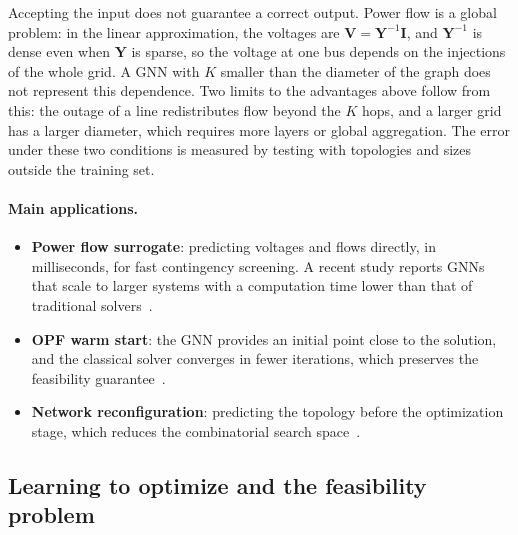 \documentclass[10pt,a4paper,oneside]{article}
\begin{document}
Accepting the input does not guarantee a correct output. Power flow is a
global problem: in the linear approximation, the voltages are
$\mathbf{V} = \mathbf{Y}^{-1}\mathbf{I}$, and $\mathbf{Y}^{-1}$ is dense even
when $\mathbf{Y}$ is sparse, so the voltage at one bus depends on the
injections of the whole grid. A GNN with $K$ smaller than the diameter of
the graph does not represent this dependence. Two limits to the advantages
above follow from this: the outage of a line redistributes flow beyond the
$K$ hops, and a larger grid has a larger diameter, which requires more
layers or global aggregation. The error under these two conditions is
measured by testing with topologies and sizes outside the training set.

\paragraph{Main applications.}
\begin{itemize}
  \item \textbf{Power flow surrogate}: predicting voltages and flows
    directly, in milliseconds, for fast contingency screening. A recent
    study reports GNNs that scale to larger systems with a computation time
    lower than that of traditional solvers~\cite{gnnpf}.
  \item \textbf{OPF warm start}: the GNN provides an initial point close to
    the solution, and the classical solver converges in fewer iterations,
    which preserves the feasibility guarantee~\cite{gnnopfinit}.
  \item \textbf{Network reconfiguration}: predicting the topology before the
    optimization stage, which reduces the combinatorial search
    space~\cite{gnnreconf}.
\end{itemize}

\subsection{Learning to optimize and the feasibility problem}
\end{document}
